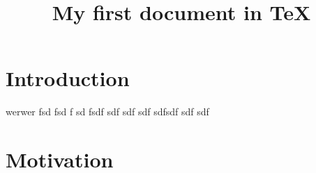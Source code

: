 \documentclass[12pt]{article}
\begin{document}
\title{My first document in TeX}
\maketitle

\section{Introduction}
werwer fsd fsd f
sd fsdf sdf sdf sdf
sdfsdf sdf sdf 
\section{Motivation}
\end{document}
